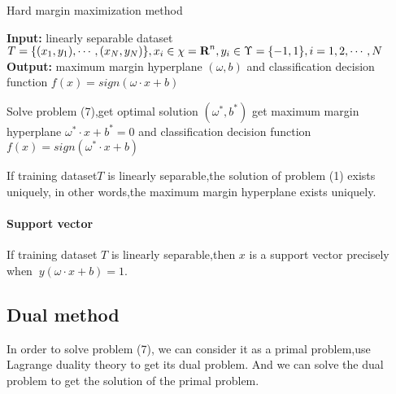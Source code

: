 \begin{algorithm}
\caption{Hard margin maximization method}
\textbf{Input:} linearly separable dataset $T=\{(x_{1},y_{1}),\cdots,(x_{N},y_{N})\},x_{i}\in\chi=\textbf{R}^n ,y_{i}\in\Upsilon=\{-1,1\},i=1,2,\cdots,N\\$
\textbf{Output:} maximum margin hyperplane $(\omega,b)$ and classification decision function $f(x)=sign(\omega\cdot x+b)$
\begin{algorithmic}[1]
\State Solve problem (7),get optimal solution $(\omega^*,b^*)$
\State get maximum margin hyperplane $\omega^*\cdot x+b^*=0$ and classification decision function $f(x)=sign(\omega^*\cdot x+b)$
\end{algorithmic}
\end{algorithm}

\begin{theorem}
 If training dataset$T$ is linearly separable,the solution of problem (1) exists uniquely, in other words,the maximum margin hyperplane exists uniquely.
\end{theorem}

\paragraph{Support vector} If training dataset $T$ is linearly separable,then $x$ is a support vector precisely when $\ y(\omega\cdot x+b)=1$.

\subsection{Dual method}

In order to solve problem (7), we can consider it as a primal problem,use Lagrange duality theory to get its dual problem. And we can solve the dual problem to get the solution of the primal problem.

